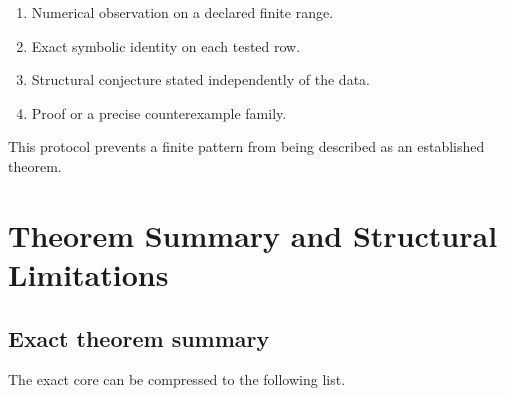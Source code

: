 \begin{enumerate}[leftmargin=1.5em]
\item Numerical observation on a declared finite range.
\item Exact symbolic identity on each tested row.
\item Structural conjecture stated independently of the data.
\item Proof or a precise counterexample family.
\end{enumerate}

This protocol prevents a finite pattern from being described as an established theorem.

\chapter{Theorem Summary and Structural Limitations}

\section{Exact theorem summary}
The exact core can be compressed to the following list.

